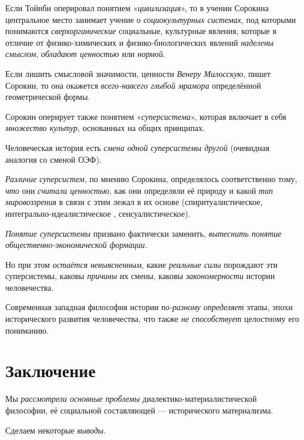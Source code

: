 \documentclass[a4paper,14pt,russian]{extreport}
\begin{document}
Если Тойнби оперировал понятием «\emph{цивилизация}», то в учении Сорокина центральное место занимает учение о \emph{социокультурных системах}, под которыми понимаются \emph{сверхорганические} социальные, культурные явления, которые в отличие от физико-химических и физико-биологических явлений \emph{наделены смыслом}, \emph{обладают ценностью} или \emph{нормой}.

Если лишить смысловой значимости, ценности \emph{Венеру Милосскую}, пишет Сорокин, то она окажется \emph{всего-навсего глыбой мрамора} определённой геометрической формы.

Сорокин оперирует также понятием «\emph{суперсистема}», которая включает в себя \emph{множество культур}, основанных на общих принципах.

Человеческая история есть \emph{смена одной суперсистемы другой} (очевидная аналогия со сменой ОЭФ).

\emph{Различие суперсистем}, по мнению Сорокина, определялось соответственно тому, \emph{что} они \emph{считали ценностью}, как они определяли её природу и какой \emph{тип мировоззрения} в связи с этим лежал в их основе (спиритуалистическое, интегрально-идеалистическое , сенсуалистическое).

\emph{Понятие суперсистемы} призвано фактически заменить, \emph{вытеснить понятие общественно-экономической формации.}

Но при этом \emph{остаётся невыясненным}, какие \emph{реальные силы} порождают эти суперсистемы, каковы \emph{причины} их смены, каковы \emph{закономерности} истории человечества.

Современная западная философия истории \emph{по-разному определяет} этапы, эпохи исторического развития человечества, что также \emph{не способствует} целостному его пониманию.

\chapter{Заключение}

Мы \emph{рассмотрели основные проблемы} диалектико-материалистической философии, её социальной составляющей --- исторического материализма.

Сделаем некоторые \emph{выводы}.
\end{document}
